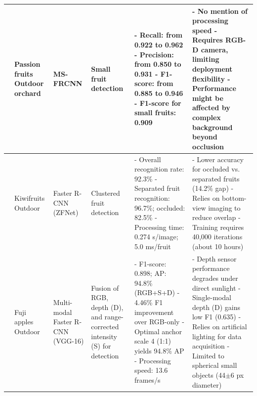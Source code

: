 \documentclass{ieeeaccess}
\begin{document}
\begin{table}[!htb]
\begin{tabular}{p{}p{}p{}p{}p{}p{}}
	\cite{tu2020passion} \newline 2020 & Passion fruits \newline Outdoor orchard & MS-FRCNN & Small fruit detection & - Recall: from 0.922 to 0.962 \newline - Precision: from 0.850 to 0.931 \newline - F1-score: from 0.885 to 0.946 \newline - F1-score for small fruits: 0.909 & - No mention of processing speed \newline - Requires RGB-D camera, limiting deployment flexibility \newline - Performance might be affected by complex background beyond occlusion \\ \midrule
	
	\cite{fu2018kiwifruit} \newline 2018 & Kiwifruits \newline Outdoor & Faster R-CNN (ZFNet) & Clustered fruit detection & - Overall recognition rate: 92.3\% \newline - Separated fruit recognition: 96.7\%; occluded: 82.5\% \newline - Processing time: 0.274 s/image; 5.0 ms/fruit & - Lower accuracy for occluded vs. separated fruits (14.2\% gap) \newline - Relies on bottom-view imaging to reduce overlap \newline - Training requires 40,000 iterations (about 10 hours) \\ \midrule

	\cite{gene2019multi} \newline 2019 & Fuji apples \newline Outdoor & Multi-modal Faster R-CNN (VGG-16) & Fusion of RGB, depth (D), and range-corrected intensity (S) for detection & - F1-score: 0.898; AP: 94.8\% (RGB+S+D) \newline - 4.46\% F1 improvement over RGB-only \newline - Optimal anchor scale 4 (1:1) yields 94.8\% AP \newline - Processing speed: 13.6 frames/s & - Depth sensor performance degrades under direct sunlight \newline - Single-modal depth (D) gains low F1 (0.635) \newline - Relies on artificial lighting for data acquisition \newline - Limited to spherical small objects (44$\pm$6 px diameter) \\ \midrule
	

\end{tabular}
\end{table}
\end{document}
